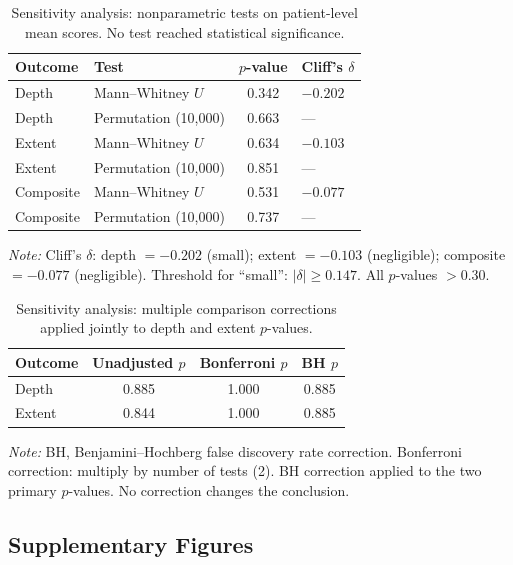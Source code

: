 \begin{table}[htbp]
\centering
\caption{Sensitivity analysis: nonparametric tests on patient-level mean scores. No test reached statistical significance.}
\label{tab:supp-nonparam}
\begin{tabular}{l l S[table-format=1.3] l}
\toprule
{Outcome} & {Test} & {$p$-value} & {Cliff's $\delta$} \\
\midrule
Depth     & Mann--Whitney $U$          & 0.342 & $-0.202$ \\
Depth     & Permutation (10{,}000)     & 0.663 & {---} \\
Extent    & Mann--Whitney $U$          & 0.634 & $-0.103$ \\
Extent    & Permutation (10{,}000)     & 0.851 & {---} \\
Composite & Mann--Whitney $U$          & 0.531 & $-0.077$ \\
Composite & Permutation (10{,}000)     & 0.737 & {---} \\
\bottomrule
\end{tabular}
\smallskip

\noindent\textit{Note:} Cliff's $\delta$: depth $= -0.202$ (small); extent $= -0.103$ (negligible); composite $= -0.077$ (negligible). Threshold for ``small'': $|\delta| \geq 0.147$. All $p$-values $> 0.30$.
\end{table}

\begin{table}[htbp]
\centering
\caption{Sensitivity analysis: multiple comparison corrections applied jointly to depth and extent $p$-values.}
\label{tab:supp-mcp}
\begin{tabular}{l S[table-format=1.3] S[table-format=1.3] S[table-format=1.3]}
\toprule
{Outcome} & {Unadjusted $p$} & {Bonferroni $p$} & {BH $p$} \\
\midrule
Depth  & 0.885 & 1.000 & 0.885 \\
Extent & 0.844 & 1.000 & 0.885 \\
\bottomrule
\end{tabular}
\smallskip

\noindent\textit{Note:} BH, Benjamini--Hochberg false discovery rate correction. Bonferroni correction: multiply by number of tests (2). BH correction applied to the two primary $p$-values. No correction changes the conclusion.
\end{table}

\clearpage
\subsection*{Supplementary Figures}

